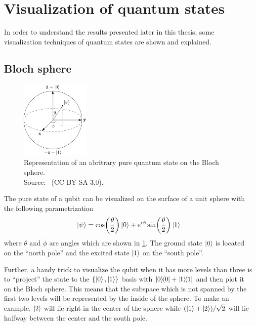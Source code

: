 \documentclass[main.tex]{subfiles}
\begin{document}
\section{Visualization of quantum states}
In order to understand the results presented later in this thesis, some visualization techniques of quantum states are shown and explained.

\subsection{Bloch sphere}
\begin{figure}[H]
    \centering
    \includegraphics[width=0.3\textwidth]{figs/bloch_sphere.png}
    \caption{Representation of an abritrary pure quantum state on the Bloch sphere.
    \\ Source:~\cite{glosser.ca_english:_2012} (CC BY-SA 3.0).
    }%
    \label{fig:bloch_sphere}
\end{figure}

The pure state of a qubit can be visualized on the surface of a unit sphere with the following parametrization
\begin{equation}
    \ket{\psi} = \cos(\frac{\theta}{2})\ket{0} + \mathrm{e}^{i\phi}\sin(\frac{\theta}{2})\ket{1}
\end{equation}
where \( \theta \) and \( \phi \) are angles which are shown in \cref{fig:bloch_sphere}.
The ground state \(\ket{0}\) is located on the ``north pole'' and the excited state \(\ket{1}\) on the ``south pole''.

Further, a handy trick to visualize the qubit when it has more levels than three is to ``project'' the state to the \(\qty{\ket{0},\ket{1}}\) basis with \( \op{0} + \op{1} \) and then plot it on the Bloch sphere.
This means that the subspace which is not spanned by the first two levels will be represented by the inside of the sphere.
To make an example, \(\ket{2}\) will lie right in the center of the sphere while \(\qty(\ket{1}+\ket{2})/\sqrt{2}\) will lie halfway between the center and the south pole.
\end{document}
